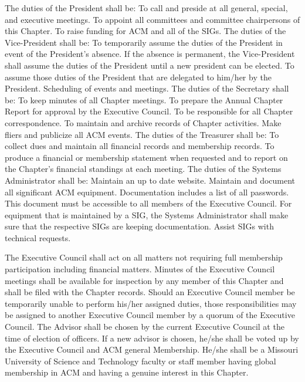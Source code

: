 \documentclass[11pt,a4paper,notitlepage]{article}
\begin{document}
The duties of the President shall be:
To call and preside at all general, special, and executive meetings.
To appoint all committees and committee chairpersons of this Chapter.
To raise funding for ACM and all of the SIGs. 
The duties of the Vice-President shall be:
To temporarily assume the duties of the President in event of the President's absence. If the absence is permanent, the Vice-President shall assume the duties of the President until a new president can be elected.
To assume those duties of the President that are delegated to him/her by the President.
Scheduling of events and meetings. 
The duties of the Secretary shall be:
To keep minutes of all Chapter meetings.
To prepare the Annual Chapter Report for approval by the Executive Council.
To be responsible for all Chapter correspondence.
To maintain and archive records of Chapter activities.
Make fliers and publicize all ACM events. 
The duties of the Treasurer shall be:
To collect dues and maintain all financial records and membership records.
To produce a financial or membership statement when requested and to report on the Chapter's financial standings at each meeting.
The duties of the Systems Administrator shall be:
Maintain an up to date website.
Maintain and document all significant ACM equipment. 
Documentation includes a list of all passwords. This document must be accessible to all members of the Executive Council.
For equipment that is maintained by a SIG, the Systems Administrator shall make sure that the respective SIGs are keeping documentation. 
Assist SIGs with technical requests. 



The Executive Council shall act on all matters not requiring full membership participation including financial matters. Minutes of the Executive Council meetings shall be available for inspection by any member of this Chapter and shall be filed with the Chapter records.
Should an Executive Council member be temporarily unable to perform his/her assigned duties, those responsibilities may be assigned to another Executive Council member by a quorum of the Executive Council.
The Advisor shall be chosen by the current Executive Council at the time of election of officers. If a new advisor is chosen, he/she shall be voted up by the Executive Council and ACM general Membership. He/she shall be a Missouri University of Science and Technology faculty or staff member having global membership in ACM and having a genuine interest in this Chapter.
\end{document}
